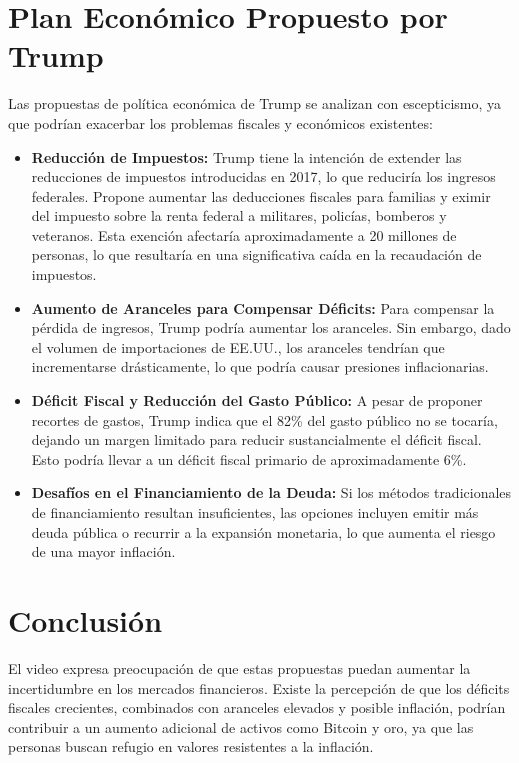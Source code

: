 \documentclass{article}
\begin{document}
\section*{Plan Económico Propuesto por Trump}
Las propuestas de política económica de Trump se analizan con escepticismo, ya que podrían exacerbar los problemas fiscales y económicos existentes:
\begin{itemize}
    \item \textbf{Reducción de Impuestos:} Trump tiene la intención de extender las reducciones de impuestos introducidas en 2017, lo que reduciría los ingresos federales. Propone aumentar las deducciones fiscales para familias y eximir del impuesto sobre la renta federal a militares, policías, bomberos y veteranos. Esta exención afectaría aproximadamente a 20 millones de personas, lo que resultaría en una significativa caída en la recaudación de impuestos.
    \item \textbf{Aumento de Aranceles para Compensar Déficits:} Para compensar la pérdida de ingresos, Trump podría aumentar los aranceles. Sin embargo, dado el volumen de importaciones de EE.UU., los aranceles tendrían que incrementarse drásticamente, lo que podría causar presiones inflacionarias.
    \item \textbf{Déficit Fiscal y Reducción del Gasto Público:} A pesar de proponer recortes de gastos, Trump indica que el 82\% del gasto público no se tocaría, dejando un margen limitado para reducir sustancialmente el déficit fiscal. Esto podría llevar a un déficit fiscal primario de aproximadamente 6\%.
    \item \textbf{Desafíos en el Financiamiento de la Deuda:} Si los métodos tradicionales de financiamiento resultan insuficientes, las opciones incluyen emitir más deuda pública o recurrir a la expansión monetaria, lo que aumenta el riesgo de una mayor inflación.
\end{itemize}

\section*{Conclusión}
El video expresa preocupación de que estas propuestas puedan aumentar la incertidumbre en los mercados financieros. Existe la percepción de que los déficits fiscales crecientes, combinados con aranceles elevados y posible inflación, podrían contribuir a un aumento adicional de activos como Bitcoin y oro, ya que las personas buscan refugio en valores resistentes a la inflación.
\end{document}

